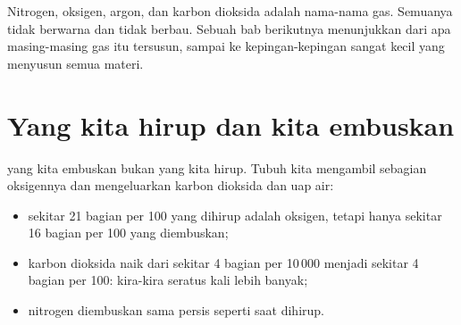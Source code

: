 \begin{remark}\label{rem:g4:air-a-mixture-of-gases:names}
Nitrogen, oksigen, argon, dan karbon dioksida adalah nama-nama gas.
Semuanya tidak berwarna dan tidak berbau. Sebuah bab berikutnya
menunjukkan dari apa masing-masing gas itu tersusun, sampai ke
kepingan-kepingan sangat kecil yang menyusun semua materi.
\end{remark}

\section{Yang kita hirup dan kita embuskan}

\begin{proposition}\label{prop:g4:air-a-mixture-of-gases:breath}
 yang kita embuskan bukan  yang kita hirup. Tubuh kita
mengambil sebagian oksigennya dan mengeluarkan karbon dioksida dan uap
air:
\begin{itemize}
  \item sekitar 21 bagian per 100  yang dihirup adalah oksigen,
        tetapi hanya sekitar 16 bagian per 100  yang diembuskan;
  \item karbon dioksida naik dari sekitar 4 bagian per 10\,000 menjadi
        sekitar 4 bagian per 100: kira-kira seratus kali lebih banyak;
  \item nitrogen diembuskan sama persis seperti saat dihirup.
\end{itemize}
\end{proposition}

